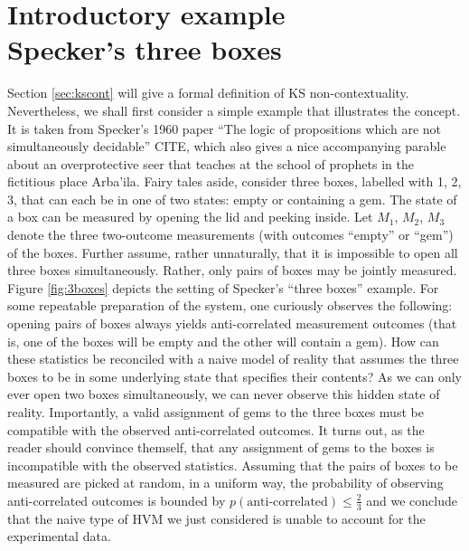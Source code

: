 \section[Introductory example\\ Specker's three boxes]{Introductory example\\ \large{Specker's three boxes}}
\label{sec:threeboxes}
Section \ref{sec:kscont} will give a formal definition of KS non-contextuality. Nevertheless, we shall first consider a simple example that illustrates the concept. It is taken from Specker's 1960 paper “The logic of propositions which are not simultaneously decidable” CITE, which also gives a nice accompanying parable about an overprotective seer that teaches at the school of prophets in the fictitious place Arba’ila. Fairy tales aside, consider three boxes, labelled with 1, 2, 3, that can each be in one of two states: empty or containing a gem. The state of a box can be measured by opening the lid and peeking inside. Let $M_{1}$, $M_{2}$, $M_{3}$ denote the three two-outcome measurements (with outcomes “empty” or “gem”) of the boxes. Further assume, rather unnaturally, that it is impossible to open all three boxes simultaneously. Rather, only pairs of boxes may be jointly measured. Figure \ref{fig:3boxes} depicts the setting of Specker's “three boxes” example. For some repeatable preparation of the system, one curiously observes the following: opening pairs of boxes always yields anti-correlated measurement outcomes (that is, one of the boxes will be empty and the other will contain a gem). How can these statistics be reconciled with a naive model of reality that assumes the three boxes to be in some underlying state that specifies their contents? As we can only ever open two boxes simultaneously, we can never observe this hidden state of reality. Importantly, a valid assignment of gems to the three boxes must be compatible with the observed anti-correlated outcomes. It turns out, as the reader should convince themself, that any assignment of gems to the boxes is incompatible with the observed statistics. Assuming that the pairs of boxes to be measured are picked at random, in a uniform way, the probability of observing anti-correlated outcomes is bounded by $p(\text{anti-correlated})\leqslant\frac{2}{3}$ and we conclude that the naive type of HVM we just considered is unable to account for the experimental data.

